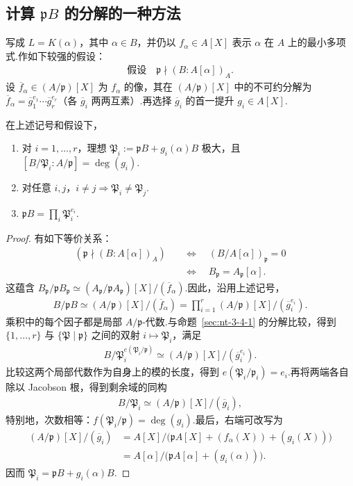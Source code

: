 \subsection{计算 $\mathfrak pB$ 的分解的一种方法}\label{sec:nt-3-4-4}
写成 $L=K(\alpha)$，其中 $\alpha\in B$，并仍以 $f_\alpha\in A[X]$ 表示 $\alpha$ 在 $A$ 上的最小多项式.作如下较强的假设：
\begin{align*}
\text{假设}\quad\mathfrak p\nmid(B:A[\alpha])_A.
\end{align*}
设 $\overline f_\alpha\in(A/\mathfrak p)[X]$ 为 $f_\alpha$ 的像，其在 $(A/\mathfrak p)[X]$ 中的不可约分解为 $\overline f_\alpha=\overline g_1^{e_1}\cdots\overline g_r^{e_r}$（各 $\overline g_i$ 两两互素）.再选择 $\overline g_i$ 的首一提升 $g_i\in A[X]$.
\begin{theorem*}
在上述记号和假设下，
\begin{enumerate}[label=\roman*)]
\item 对 $i=1,\ldots,r$，理想 $\mathfrak P_i:=\mathfrak pB+g_i(\alpha)B$ 极大，且 $[B/\mathfrak P_i:A/\mathfrak p]=\deg(g_i)$.
\item 对任意 $i,j$，$i\ne j\Rightarrow\mathfrak P_i\ne\mathfrak P_j$.
\item $\mathfrak pB=\prod_i\mathfrak P_i^{e_i}$.
\end{enumerate}
\end{theorem*}
\begin{proof}
有如下等价关系：
\begin{align*}
(\mathfrak p\nmid(B:A[\alpha])_A)&\quad\Longleftrightarrow\quad(B/A[\alpha])_{\mathfrak p}=0
\\&\quad\Longleftrightarrow\quad B_{\mathfrak p}=A_{\mathfrak p}[\alpha].
\end{align*}
这蕴含 $B_{\mathfrak p}/\mathfrak pB_{\mathfrak p}\simeq(A_{\mathfrak p}/\mathfrak pA_{\mathfrak p})[X]/(\overline f_\alpha)$.因此，沿用上述记号，
\begin{align*}
B/\mathfrak pB\simeq(A/\mathfrak p)[X]/(\overline f_\alpha)
=\prod_{i=1}^r(A/\mathfrak p)[X]/(\overline g_i^{e_i}).
\end{align*}
乘积中的每个因子都是局部 $A/\mathfrak p$-代数.与命题~\ref{sec:nt-3-4-1} 的分解比较，得到 $\{1,\ldots,r\}$ 与 $\{\mathfrak P\mid\mathfrak p\}$ 之间的双射 $i\mapsto\mathfrak P_i$，满足
\begin{align*}
B/\mathfrak P_i^{e(\mathfrak P_i/\mathfrak p)}\simeq(A/\mathfrak p)[X]/(\overline g_i^{e_i}).
\end{align*}
比较这两个局部代数作为自身上的模的长度，得到 $e(\mathfrak P_i/\mathfrak p_i)=e_i$.再将两端各自除以 Jacobson 根，得到剩余域的同构
\begin{align*}
B/\mathfrak P_i\simeq(A/\mathfrak p)[X]/(\overline g_i),
\end{align*}
特别地，次数相等：$f(\mathfrak P_i/\mathfrak p)=\deg(g_i)$.最后，右端可改写为
\begin{align*}
(A/\mathfrak p)[X]/(\overline g_i)
&=A[X]/\bigl(\mathfrak pA[X]+(f_\alpha(X))+(g_i(X))\bigr)\\
&=A[\alpha]/\bigl(\mathfrak pA[\alpha]+(g_i(\alpha))\bigr).
\end{align*}
因而 $\mathfrak P_i=\mathfrak pB+g_i(\alpha)B$.
\end{proof}
